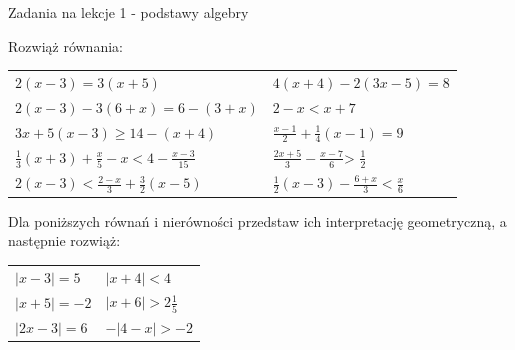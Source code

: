 \documentclass[12pt,a4paper]{article}
\theoremstyle{break}
\begin{document}
	
	\begin{center}
		\LARGE Zadania na lekcje 1 - podstawy algebry
	\end{center}
	\vspace{1.5cm}
	
	\begin{zad}
		Rozwiąż równania:
	\end{zad}
	\begin{enumerate}[a)] \begin{tabular}{p{7cm} p{7cm}} 
		\item $2(x-3)=3(x+5)$ & \vspace{0.25cm} 	\item$4(x+4)-2(3x-5)=8$ \\
		\item $2(x-3)-3(6+x)=6-(3+x)$ & \item $2-x<x+7$ \\
		\item $3x+5(x-3)\geq 14-(x+4)$ & \item $\frac{x-1}{2}+\frac{1}{4}(x-1)=9$ \\
		\item $\frac{1}{3}(x+3)+\frac{x}{5} - x < 4 - \frac{x-3}{15}$ & \item $\frac{2x+5}{3}-\frac{x-7}{6}$> $\frac{1}{2}$ \\
		\item $2(x-3)<\frac{2-x}{3}+\frac{3}{2}(x-5)$ & \item $\frac{1}{2}(x-3)-\frac{6+x}{3}<\frac{x}{6}$ \\
	\end{tabular} \end{enumerate}

	\begin{zad}
		Dla poniższych równań i nierówności przedstaw ich interpretację geometryczną, a następnie rozwiąż:
	\end{zad}
	\begin{enumerate}[a)] \begin{tabular}{p{7cm} p{7cm}} 
		\item $|x-3|=5$ & \vspace{0.25cm} 	\item$|x+4|<4$ \\
		\item $|x+5|=-2$ & \item $|x+6|>2\frac{1}{5}$ \\
		\item $|2x-3|=6$ & \item $-|4-x|>-2$ \\
	\end{tabular} \end{enumerate}
	
\end{document}
